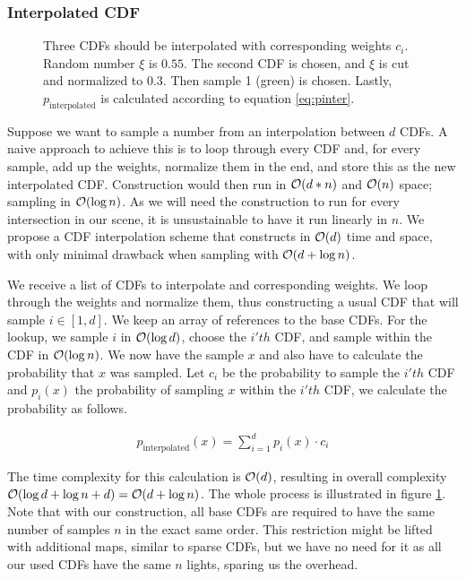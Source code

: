 \subsubsection{Interpolated CDF}
\label{sec:intcdf}
\begin{figure}[htb] 
	\centering
    
    \caption{Three CDFs should be interpolated with corresponding weights $c_i$. Random number $\xi$ is $0.55$. The second CDF is chosen, and $\xi$ is cut and normalized to $0.3$. Then sample 1 (green) is chosen. Lastly, $p_{\text{interpolated}}$ is calculated according to equation \ref{eq:pinter}.} 
    \label{fig:interpolatedCDF}
\end{figure}

Suppose we want to sample a number from an interpolation between $d$ CDFs. A naive approach to achieve this is to loop through every CDF and, for every sample, add up the weights, normalize them in the end, and store this as the new interpolated CDF. Construction would then run in $\mathcal{O}(d * n)$ and $\mathcal{O}(n)$ space; sampling in $\mathcal{O}(\log{n})$. As we will need the construction to run for every intersection in our scene, it is unsustainable to have it run linearly in $n$. We propose a CDF interpolation scheme that constructs in $\mathcal{O}(d)$ time and space, with only minimal drawback when sampling with $\mathcal{O}(d + \log{n})$.

We receive a list of CDFs to interpolate and corresponding weights. We loop through the weights and normalize them, thus constructing a usual CDF that will sample $i \in [1,d]$. We keep an array of references to the base CDFs. For the lookup, we sample $i$ in $\mathcal{O}(\log{d})$, choose the $i'th$ CDF, and sample within the CDF in $\mathcal{O}(\log{n})$. We now have the sample $x$ and also have to calculate the probability that $x$ was sampled. Let $c_i$ be the probability to sample the $i'th$ CDF and $p_i(x)$ the probability of sampling $x$ within the $i'th$ CDF, we calculate the probability as follows.

\begin{align}\label{eq:pinter}
    p_{\text{interpolated}}(x) = \sum_{i=1}^{d}p_{i}(x) \cdot c_i
\end{align}

The time complexity for this calculation is $\mathcal{O}(d)$, resulting in overall complexity $\mathcal{O}(\log{d} + \log{n} + d) = \mathcal{O}(d + \log{n})$. The whole process is illustrated in figure \ref{fig:interpolatedCDF}. Note that with our construction, all base CDFs are required to have the same number of samples $n$ in the exact same order. This restriction might be lifted with additional maps, similar to sparse CDFs, but we have no need for it as all our used CDFs have the same $n$ lights, sparing us the overhead.

